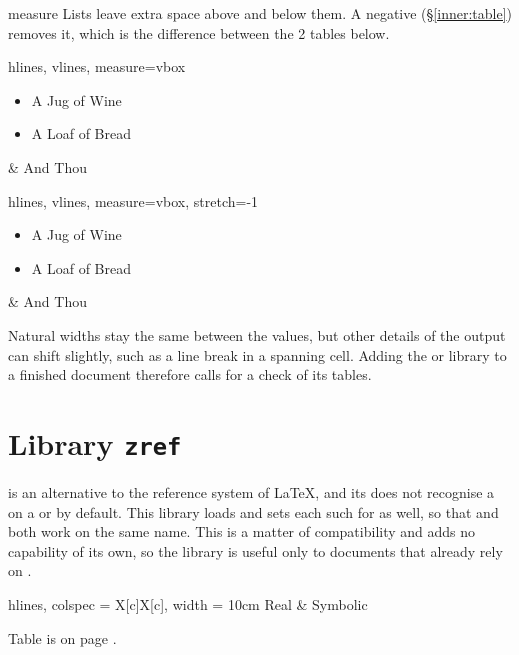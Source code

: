 \begin{codedescribe}[
        key,
        new=2021N,
        update=2025A
    ]{measure}
    Lists leave extra space above and below them. A negative  (\S\ref{inner:table}) removes it, which is the difference between the 2 tables below.

    \begin{codestore}[st=lib:varwidth:stretch]
        \begin{tblr}{hlines, vlines, measure=vbox}
            \begin{itemize}
                \item A Jug of Wine
                \item A Loaf of Bread
            \end{itemize} & And Thou
        \end{tblr}\quad
        \begin{tblr}{hlines, vlines, measure=vbox, stretch=-1}
            \begin{itemize}
                \item A Jug of Wine
                \item A Loaf of Bread
            \end{itemize} & And Thou
        \end{tblr}\end{codestore}
    \begin{center}
    \end{center}
    \begin{tsremark}
        Natural widths stay the same between the values, but other details of the output can shift slightly, such as a line break in a spanning cell. Adding the  or  library to a finished document therefore calls for a check of its tables.
    \end{tsremark}
\end{codedescribe}

\section{Library \texttt{zref}}\label{lib:zref}
 is an alternative to the reference system of \LaTeX{}, and its  does not recognise a  on a  or  by default. This library loads  and sets each such  for  as well, so that  and  both work on the same name. This is a matter of compatibility and adds no capability of its own, so the library is useful only to documents that already rely on .

\begin{codestore}[st=lib:zref]
    \begin{longtblr}[
        caption = {A table with a label},
        label = {tab:zref},
        ]{hlines, colspec = {X[c]X[c]}, width = 10cm}
        Real & Symbolic
    \end{longtblr}
    Table  is on page .\end{codestore}
